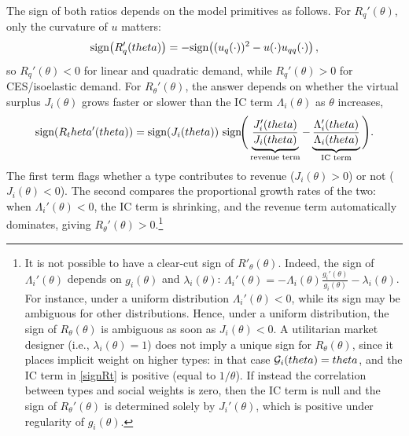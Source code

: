 \documentclass{class}
\begin{document}
The sign of both ratios depends on the model primitives as follows. For $R_q'(\theta)$, only the curvature of $u$ matters:
\[\textnormal{sign}\!\left(R_q'(theta)\right)=-\textnormal{sign}\!\left((u_q(\cdot))^2-u(\cdot)u_{qq}(\cdot)\right),\]
so $R_q'(\theta)<0$ for linear and quadratic demand, while $R_q'(\theta)>0$ for CES/isoelastic demand. For $R_\theta'(\theta)$, the answer depends on whether the virtual surplus $J_i(\theta)$ grows faster or slower than the IC term $\Lambda_i(\theta)$ as $\theta$ increases,
\[
\textnormal{sign}\!\left(R_theta'(theta)\right) = \textnormal{sign}\!\left(J_i(theta)\right)\,\textnormal{sign}\!\Bigg(\underbrace{\frac{J_i'(theta)}{J_i(theta)}}_{\text{revenue term}} - \underbrace{\frac{\Lambda_i'(theta)}{\Lambda_i(theta)}}_{\text{IC term}}\Bigg).
\]
The first term flags whether a type contributes to revenue ($J_i(\theta)>0$) or not ($J_i(\theta)<0$). The second compares the proportional growth rates of the two: when $\Lambda_i'(\theta)<0$, the IC term is shrinking, and the revenue term automatically dominates, giving $R_\theta'(\theta)>0$.\footnote{It is not possible to have a clear-cut sign of $R'_\theta(\theta)$. Indeed, the sign of $\Lambda_i'(\theta)$ depends on $g_i(\theta)$ and $\lambda_i(\theta)$: $\Lambda_i'(\theta)=-\Lambda_i(\theta)\frac{g_i'(\theta)}{g_i(\theta)}-\lambda_i(\theta)$. For instance, under a uniform distribution $\Lambda_i'(\theta)<0$, while its sign may be ambiguous for other distributions. Hence, under a uniform distribution, the sign of $R_\theta(\theta)$ is ambiguous as soon as $J_i(\theta)<0$. A utilitarian market designer (i.e., $\lambda_i(\theta)=1$) does not imply a unique sign for $R_\theta(\theta)$, since it places implicit weight on higher types: in that case $\mathcal{G}_i(theta)=theta$, and the IC term in \ref{signRt} is positive (equal to $1/\theta$). If instead the correlation between types and social weights is zero, then the IC term is null and the sign of $R_\theta'(\theta)$ is determined solely by $J_i'(\theta)$, which is positive under regularity of $g_i(\theta)$.} 
\end{document}
